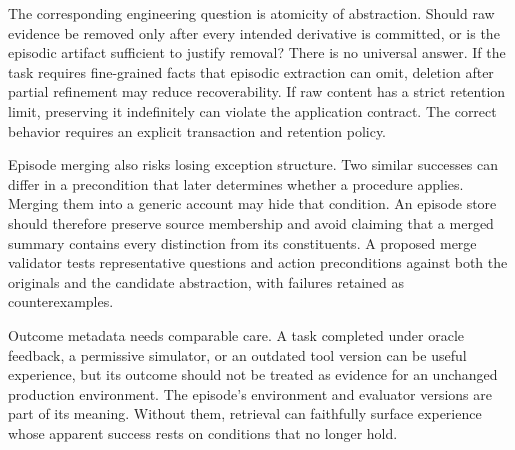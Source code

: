 The corresponding engineering question is atomicity of abstraction. Should raw evidence be removed only after every intended derivative is committed, or is the episodic artifact sufficient to justify removal? There is no universal answer. If the task requires fine-grained facts that episodic extraction can omit, deletion after partial refinement may reduce recoverability. If raw content has a strict retention limit, preserving it indefinitely can violate the application contract. The correct behavior requires an explicit transaction and retention policy.

Episode merging also risks losing exception structure. Two similar successes can differ in a precondition that later determines whether a procedure applies. Merging them into a generic account may hide that condition. An episode store should therefore preserve source membership and avoid claiming that a merged summary contains every distinction from its constituents. A proposed merge validator tests representative questions and action preconditions against both the originals and the candidate abstraction, with failures retained as counterexamples.

Outcome metadata needs comparable care. A task completed under oracle feedback, a permissive simulator, or an outdated tool version can be useful experience, but its outcome should not be treated as evidence for an unchanged production environment. The episode's environment and evaluator versions are part of its meaning. Without them, retrieval can faithfully surface experience whose apparent success rests on conditions that no longer hold.

